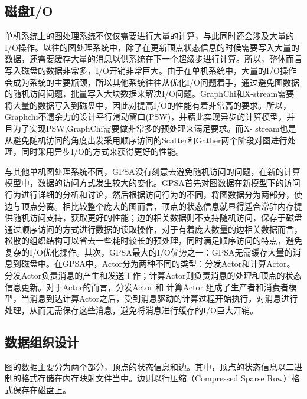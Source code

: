 \subsection{磁盘I/O}

单机系统上的图处理系统不仅仅需要进行大量的计算，与此同时还会涉及大量的I/O操作。以往的图处理系统中，除了在更新顶点状态信息的时候需要写入大量的数据，还需要缓存大量的消息以供系统在下一个超级步进行计算。所以，整体而言写入磁盘的数据非常多，I/O开销非常巨大。由于在单机系统中，大量的I/O操作会成为系统的主要瓶颈，所以其他系统往往从优化I/O问题着手，通过避免图数据的随机访问问题，批量写入大块数据来解决I/O问题。GraphChi和X-stream需要将大量的数据写入到磁盘中，因此对提高I/O的性能有着非常高的要求。所以，Graphchi不遗余力的设计平行滑动窗口(PSW)，并藉此实现异步的计算模型，并且为了实现PSW,GraphChi需要做非常多的预处理来满足要求。而X- stream也是从避免随机访问的角度出发采用顺序访问的Scatter和Gather两个阶段对图进行处理，同时采用异步I/O的方式来获得更好的性能。

与其他单机图处理系统不同，GPSA没有刻意去避免随机访问的问题，在新的计算模型中，数据的访问方式发生较大的变化。GPSA首先对图数据在新模型下的访问行为进行详细的分析和讨论，然后根据访问行为的不同，将图数据分为两部分，使边与顶点分离。相比较整个庞大的图而言，顶点的状态信息就显得适合常驻内存提供随机访问支持，获取更好的性能；边的相关数据则不支持随机访问，保存于磁盘通过顺序访问的方式进行数据的读取操作，对于有着庞大数量的边相关数据而言，松散的组织结构可以省去一些耗时较长的预处理，同时满足顺序访问的特点，避免复杂的I/O优化操作。其次，GPSA最大的I/O优势之一：GPSA无需缓存大量的消息到磁盘中。在GPSA中，Actor分为两种不同的类型：分发Actor和计算Actor。分发Actor负责消息的产生和发送工作；计算Actor则负责消息的处理和顶点的状态信息更新。对于Actor的而言，分发Actor 和 计算Actor 组成了生产者和消费者模型，当消息到达计算Actor之后，受到消息驱动的计算过程开始执行，对消息进行处理，从而无需保存这些消息，避免将消息进行缓存的I/O巨大开销。

\subsection{数据组织设计}
图的数据主要分为两个部分，顶点的状态信息和边。其中，顶点的状态信息以二进制的格式存储在内存映射文件当中。边则以行压缩（Compressed Sparse Row）格式保存在磁盘上。

